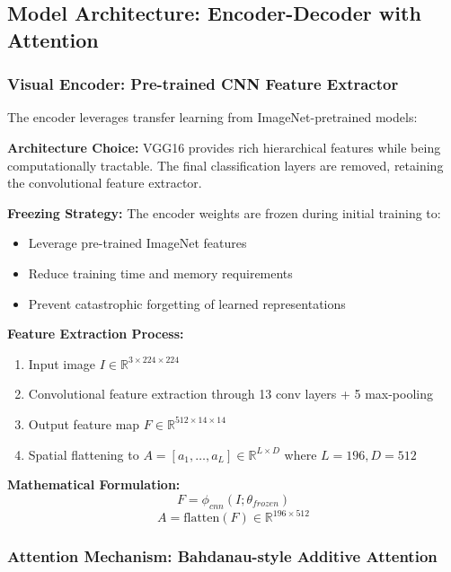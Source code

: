 \documentclass[conference]{IEEEtran}
\begin{document}
\subsection{Model Architecture: Encoder-Decoder with Attention}
\label{sec:q1_architecture}

\subsubsection{Visual Encoder: Pre-trained CNN Feature Extractor}
\label{sec:q1_encoder}

The encoder leverages transfer learning from ImageNet-pretrained models:

\textbf{Architecture Choice:} VGG16 provides rich hierarchical features while being computationally tractable. The final classification layers are removed, retaining the convolutional feature extractor.

\textbf{Freezing Strategy:} The encoder weights are frozen during initial training to:
\begin{itemize}
  \item Leverage pre-trained ImageNet features
  \item Reduce training time and memory requirements
  \item Prevent catastrophic forgetting of learned representations
\end{itemize}

\textbf{Feature Extraction Process:}
\begin{enumerate}
  \item Input image $I \in \mathbb{R}^{3 \times 224 \times 224}$
  \item Convolutional feature extraction through 13 conv layers + 5 max-pooling
  \item Output feature map $F \in \mathbb{R}^{512 \times 14 \times 14}$
  \item Spatial flattening to $A = [a_1, \dots, a_L] \in \mathbb{R}^{L \times D}$ where $L = 196, D = 512$
\end{enumerate}

\textbf{Mathematical Formulation:}
\begin{equation}
F = \phi_{cnn}(I; \theta_{frozen})
\end{equation}
\begin{equation}
A = \text{flatten}(F) \in \mathbb{R}^{196 \times 512}
\end{equation}

\subsubsection{Attention Mechanism: Bahdanau-style Additive Attention}
\label{sec:q1_attention}
\end{document}
